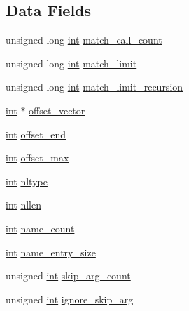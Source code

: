 \subsection*{Data Fields}
\begin{DoxyCompactItemize}
\item 
unsigned long \hyperlink{pcre_8txt_a42dfa4ff673c82d8efe7144098fbc198}{int} \hyperlink{structmatch__data_a5e6bd79005e22ca77960df0d6a31c462}{match\+\_\+call\+\_\+count}
\item 
unsigned long \hyperlink{pcre_8txt_a42dfa4ff673c82d8efe7144098fbc198}{int} \hyperlink{structmatch__data_aa0507950b18a504e0898eaa1e108d9f0}{match\+\_\+limit}
\item 
unsigned long \hyperlink{pcre_8txt_a42dfa4ff673c82d8efe7144098fbc198}{int} \hyperlink{structmatch__data_a18988c68727a8b372312e1f445c6d3a5}{match\+\_\+limit\+\_\+recursion}
\item 
\hyperlink{pcre_8txt_a42dfa4ff673c82d8efe7144098fbc198}{int} $\ast$ \hyperlink{structmatch__data_a42ec3cf532803173d59637f9459637c0}{offset\+\_\+vector}
\item 
\hyperlink{pcre_8txt_a42dfa4ff673c82d8efe7144098fbc198}{int} \hyperlink{structmatch__data_a39b086546dc588e6dc2f3af1a82b9313}{offset\+\_\+end}
\item 
\hyperlink{pcre_8txt_a42dfa4ff673c82d8efe7144098fbc198}{int} \hyperlink{structmatch__data_a93ffc54250bf51f1e979becfa68c7fc2}{offset\+\_\+max}
\item 
\hyperlink{pcre_8txt_a42dfa4ff673c82d8efe7144098fbc198}{int} \hyperlink{structmatch__data_a2633f641c966b838ce255ce6da811fb1}{nltype}
\item 
\hyperlink{pcre_8txt_a42dfa4ff673c82d8efe7144098fbc198}{int} \hyperlink{structmatch__data_a492828201e679386f5f172ff696522b4}{nllen}
\item 
\hyperlink{pcre_8txt_a42dfa4ff673c82d8efe7144098fbc198}{int} \hyperlink{structmatch__data_a1db28942487d4e133a0704d5a1ca0bd3}{name\+\_\+count}
\item 
\hyperlink{pcre_8txt_a42dfa4ff673c82d8efe7144098fbc198}{int} \hyperlink{structmatch__data_a87868ed177f75ba2ee731a9241a3912c}{name\+\_\+entry\+\_\+size}
\item 
unsigned \hyperlink{pcre_8txt_a42dfa4ff673c82d8efe7144098fbc198}{int} \hyperlink{structmatch__data_a349f6b34f861a9873e653d70e2998c42}{skip\+\_\+arg\+\_\+count}
\item 
unsigned \hyperlink{pcre_8txt_a42dfa4ff673c82d8efe7144098fbc198}{int} \hyperlink{structmatch__data_a36d4f1f1f33dd2484bc545514a3eccfe}{ignore\+\_\+skip\+\_\+arg}

\end{DoxyCompactItemize}
